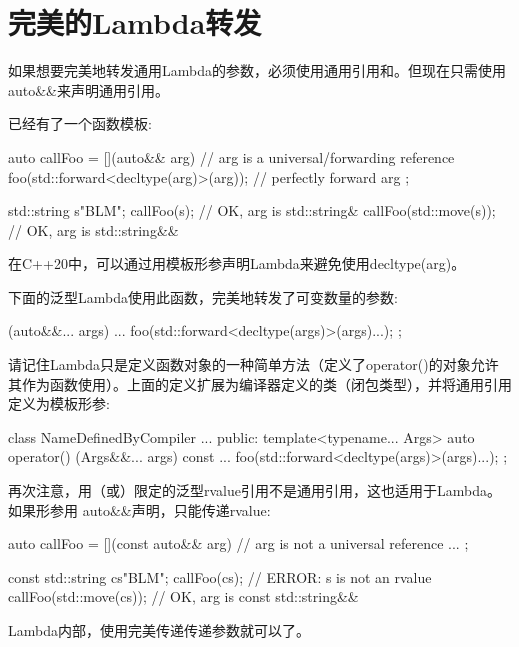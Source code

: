 \section{完美的Lambda转发}
如果想要完美地转发通用Lambda的参数，必须使用通用引用和。但现在只需使用auto\&\&来声明通用引用。

已经有了一个函数模板:

\begin{cppcode}
auto callFoo = [](auto&& arg) { // arg is a universal/forwarding reference
	foo(std::forward<decltype(arg)>(arg)); // perfectly forward arg
};

std::string s{"BLM"};
callFoo(s); // OK, arg is std::string&
callFoo(std::move(s)); // OK, arg is std::string&&
\end{cppcode}

在C++20中，可以通过用模板形参声明Lambda来避免使用decltype(arg)。

下面的泛型Lambda使用此函数，完美地转发了可变数量的参数:

\begin{cppcode}
[] (auto&&... args) {
	...
	foo(std::forward<decltype(args)>(args)...);
};
\end{cppcode}

请记住Lambda只是定义函数对象的一种简单方法（定义了operator()的对象允许其作为函数使用）。上面的定义扩展为编译器定义的类（闭包类型），并将通用引用定义为模板形参:

\begin{cppcode}
class NameDefinedByCompiler {
	...
	public:
	template<typename... Args>
	auto operator() (Args&&... args) const {
		...
		foo(std::forward<decltype(args)>(args)...);
	}
};
\end{cppcode}

再次注意，用（或）限定的泛型rvalue引用不是通用引用，这也适用于Lambda。如果形参用 auto\&\&声明，只能传递rvalue:

\begin{cppcode}
auto callFoo = [](const auto&& arg) { // arg is not a universal reference
	...
};

const std::string cs{"BLM"};
callFoo(cs); // ERROR: s is not an rvalue
callFoo(std::move(cs)); // OK, arg is const std::string&&
\end{cppcode}

Lambda内部，使用完美传递传递参数就可以了。
















































